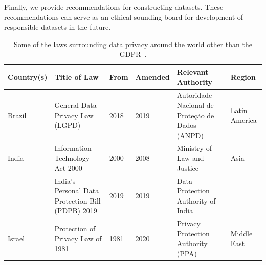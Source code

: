 \documentclass[journal]{IEEEtran}
\begin{document}
Finally, we provide recommendations for constructing datasets. These recommendations can serve as an ethical sounding board for development of responsible datasets in the future.



\begin{table}[]
\centering
\caption{\label{tab:regulations} Some of the laws surrounding data privacy around the world other than the GDPR~\cite{regulation2016regulation}.}
\begin{tabular}{|C{0.1\textwidth}|p{0.3\textwidth}|C{0.04\textwidth}|C{0.055\textwidth}|p{0.26\textwidth}|C{0.09\textwidth}|}
\hline
\textbf{Country(s)}       & \textbf{Title of Law}                                                                       & \textbf{From} & \textbf{Amended} & \textbf{Relevant Authority}                   & \textbf{Region}                    \\ \hline
Brazil                    & General Data Privacy Law (LGPD) \cite{brazil}                                              & 2018          & 2019             & Autoridade Nacional de Proteção de Dados (ANPD)      & Latin America                      \\
India                     & Information Technology Act 2000 \cite{indiait}                                             & 2000          & 2008             & Ministry of Law and Justice                          & Asia                               \\
                          & India's Personal Data Protection Bill (PDPB) 2019 \cite{indiapdpb}                         & 2019          & 2019             & Data Protection Authority of India                   &                                    \\
Israel                    & Protection of Privacy Law of 1981 \cite{israel}                                            & 1981          & 2020             & Privacy Protection Authority (PPA)                   & Middle East                        \\

\end{tabular}
\end{table}
\end{document}
